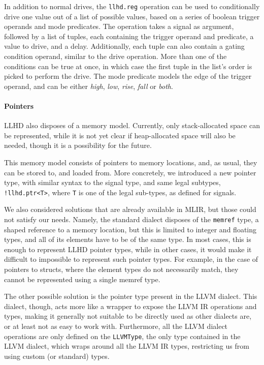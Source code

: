 In addition to normal drives, the \texttt{llhd.reg} operation can be used to conditionally drive one value out of a list of possible values, based on a series of boolean trigger operands and mode predicates. The operation takes a signal as argument, followed by a list of tuples, each containing the trigger operand and predicate, a value to drive, and a delay. Additionally, each tuple can also contain a gating condition operand, similar to the drive operation. More than one of the conditions can be true at once, in which case the first tuple in the list's order is picked to perform the drive. The mode predicate models the edge of the trigger operand, and can be either \textit{high}, \textit{low}, \textit{rise}, \textit{fall} or \textit{both}.

\paragraph{Pointers}
LLHD also disposes of a memory model. Currently, only stack-allocated space can be represented, while it is not yet clear if heap-allocated space will also be needed, though it is a possibility for the future.

This memory model consists of pointers to memory locations, and, as usual, they can be stored to, and loaded from. More concretely, we introduced a new pointer type, with similar syntax to the signal type, and same legal subtypes, \ie \texttt{!llhd.ptr<T>}, where \texttt{T} is one of the legal sub-types, as defined for signals.

We also considered solutions that are already available in MLIR, but those could not satisfy our needs. Namely, the standard dialect disposes of the \texttt{memref} type, a shaped reference to a memory location, but this is limited to integer and floating types, and all of its elements have to be of the same type. In most cases, this is enough to represent LLHD pointer types, while in other cases, it would make it difficult to impossible to represent such pointer types. For example, in the case of pointers to structs, where the element types do not necessarily match, they cannot be represented using a single memref type.

The other possible solution is the pointer type present in the LLVM dialect. This dialect, though, acts more like a wrapper to expose the LLVM IR operations and types, making it generally not suitable to be directly used as other dialects are, or at least not as easy to work with. Furthermore, all the LLVM dialect operations are only defined on the \texttt{LLVMType}, the only type contained in the LLVM dialect, which wraps around all the LLVM IR types, restricting us from using custom (or standard) types.

